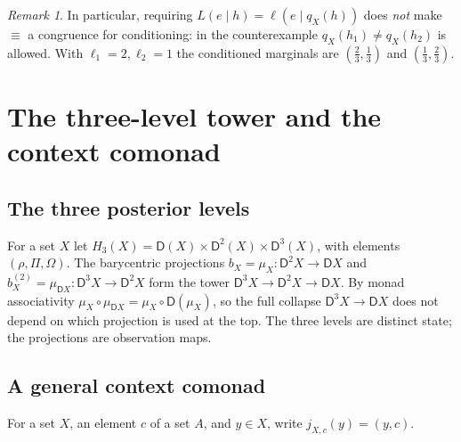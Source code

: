 \documentclass[11pt]{article}
\theoremstyle{definition}
\theoremstyle{remark}
\newtheorem{remark}[theorem]{Remark}
\newcommand{\D}{\mathsf{D}}
\begin{document}
\begin{remark}
In particular, requiring $L(e\mid h)=\ell(e\mid q_X(h))$ does \emph{not} make $\equiv$ a congruence for
conditioning: in the counterexample $q_X(h_1)\ne q_X(h_2)$ is allowed. With $\ell_1=2,\ell_2=1$ the
conditioned marginals are $(\tfrac23,\tfrac13)$ and $(\tfrac13,\tfrac23)$.
\end{remark}

\section{The three-level tower and the context comonad}

\subsection{The three posterior levels}

For a set $X$ let $H_3(X)=\D(X)\times\D^2(X)\times\D^3(X)$, with elements $(\rho,\Pi,\Omega)$. The
barycentric projections $b_X=\mu_X\colon\D^2X\to\D X$ and $b^{(2)}_X=\mu_{\D X}\colon\D^3X\to\D^2X$
form the tower $\D^3X\to\D^2X\to\D X$. By monad associativity
$\mu_X\circ\mu_{\D X}=\mu_X\circ\D(\mu_X)$, so the full collapse $\D^3X\to\D X$ does not depend on
which projection is used at the top. The three levels are distinct state; the projections are
observation maps.

\subsection{A general context comonad}

For a set $X$, an element $c$ of a set $A$, and $y\in X$, write $j_{X,c}(y)=(y,c)$.
\end{document}

